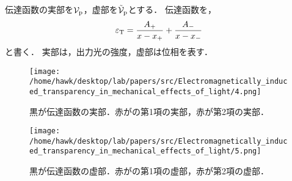       伝達函数の実部を$\mathcal{V}_{\mathrm{p}}$，虚部を$\tilde{\mathcal{V}}_{\mathrm{p}}$とする．
      伝達函数を，
      \begin{align}
        \varepsilon_{\mathrm{T}} = \frac{A_+}{x - x_+} + \frac{A_-}{x - x_-} \label{PhysRevA.81.041803-trans}
      \end{align}
      と書く．
      実部は，出力光の強度，虚部は位相を表す．
      \begin{figure}[H]
        \centering
        \texttt{[image: /home/hawk/desktop/lab/papers/src/Electromagnetically\_induced\_transparency\_in\_mechanical\_effects\_of\_light/4.png]}
        \caption{黒が伝達函数の実部．赤がの第1項の実部，赤が第2項の実部．}
      \end{figure}
      \begin{figure}[H]
        \centering
        \texttt{[image: /home/hawk/desktop/lab/papers/src/Electromagnetically\_induced\_transparency\_in\_mechanical\_effects\_of\_light/5.png]}
        \caption{黒が伝達函数の虚部．赤がの第1項の虚部，赤が第2項の虚部．}
      \end{figure}